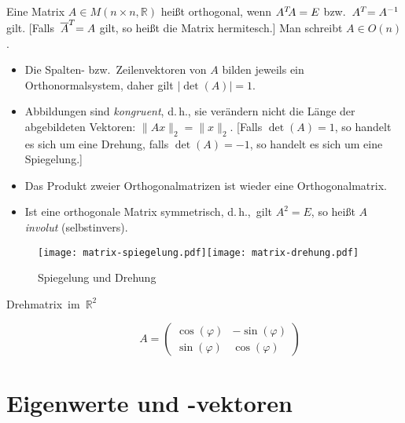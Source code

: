 Eine Matrix $A\in M(n\times n,\mathbb{R})$ heißt orthogonal, wenn $A\t A=E$ bzw.~$A\t=A^{-1}$ gilt.
[Falls~$\overline{A}\t = A$ gilt, so heißt die Matrix hermitesch.]
Man schreibt $A\in O(n)$.
\begin{itemize}
  \item Die Spalten- bzw.~Zeilenvektoren von $A$ bilden jeweils ein Orthonormalsystem, daher gilt $\lvert\det(A)\rvert=1$.
  \item Abbildungen sind \emph{kongruent}, d.\,h., sie verändern nicht die Länge der abgebildeten Vektoren: $\lVert Ax \rVert_2 = \lVert x \rVert_2$.
	[Falls $\det(A)=1$, so handelt es sich um eine Drehung, falls $\det(A)=-1$, so handelt es sich um eine Spiegelung.]
  \item Das Produkt zweier Orthogonalmatrizen ist wieder eine Orthogonalmatrix.
  \item {}
	Ist eine orthogonale Matrix symmetrisch, d.\,h.,~gilt $A^2=E$, so heißt $A$ \emph{involut} (selbstinvers).
\end{itemize}

\begin{figure}[htb]
\centering\texttt{[image: matrix-spiegelung.pdf]}\hfil\texttt{[image: matrix-drehung.pdf]}

\caption{Spiegelung und Drehung}
\end{figure}

\begin{description}
\item [{Drehmatrix~im~$\mathbb{R}^{2}$}]
\[
  A = \begin{pmatrix}
    \cos(\varphi) & -\sin(\varphi) \\
    \sin(\varphi) &  \cos(\varphi)
  \end{pmatrix}
\]
\end{description}

\section{Eigenwerte und -vektoren}


